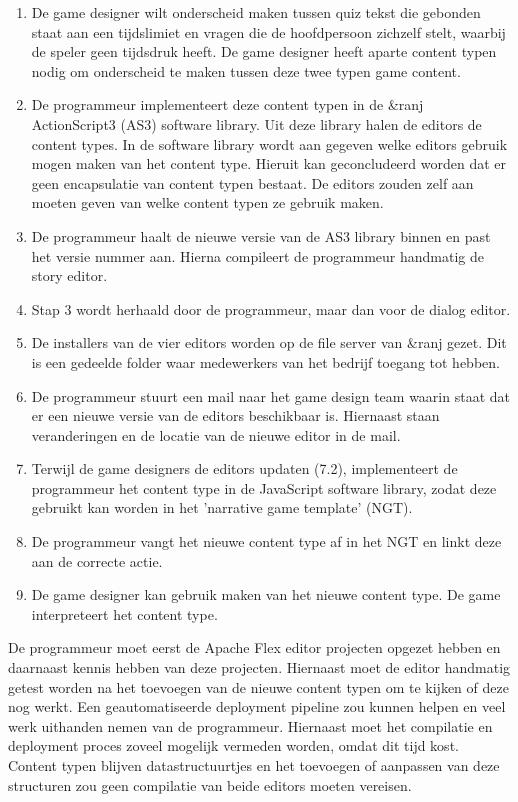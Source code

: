 \begin{enumerate}
    \item De game designer wilt onderscheid maken tussen quiz tekst die gebonden staat aan een tijdslimiet en vragen die de hoofdpersoon zichzelf stelt, waarbij de speler geen tijdsdruk heeft. De game designer heeft aparte content typen nodig om onderscheid te maken tussen deze twee typen game content.
    \item De programmeur implementeert deze content typen in de \&ranj ActionScript3 (AS3) software library. Uit deze library halen de editors de content types. In de software library wordt aan gegeven welke editors gebruik mogen maken van het content type. Hieruit kan geconcludeerd worden dat er geen encapsulatie van content typen bestaat. De editors zouden zelf aan moeten geven van welke content typen ze gebruik maken.
    \item De programmeur haalt de nieuwe versie van de AS3 library binnen en past het versie nummer aan. Hierna compileert de programmeur handmatig de story editor.    \item Stap 3 wordt herhaald door de programmeur, maar dan voor de dialog editor.
    \item De installers van de vier editors worden op de file server van \&ranj gezet. Dit is een gedeelde folder waar medewerkers van het bedrijf toegang tot hebben.
    \item De programmeur stuurt een mail naar het game design team waarin staat dat er een nieuwe versie van de editors beschikbaar is. Hiernaast staan veranderingen en de locatie van de nieuwe editor in de mail.
    \item Terwijl de game designers de editors updaten (7.2), implementeert de programmeur het content type in de JavaScript software library, zodat deze gebruikt kan worden in het 'narrative game template' (NGT).
    \item De programmeur vangt het nieuwe content type af in het NGT en linkt deze aan de correcte actie.
    \item De game designer kan gebruik maken van het nieuwe content type. De game interpreteert het content type.
\end{enumerate}

\noindent De programmeur moet eerst de Apache Flex editor projecten opgezet hebben en daarnaast kennis hebben van deze projecten. Hiernaast moet de editor handmatig getest worden na het toevoegen van de nieuwe content typen om te kijken of deze nog werkt.
Een geautomatiseerde deployment pipeline zou kunnen helpen en veel werk uithanden nemen van de programmeur. Hiernaast moet het compilatie en deployment proces zoveel mogelijk vermeden worden, omdat dit tijd kost. Content typen blijven datastructuurtjes en het toevoegen of aanpassen van deze structuren zou geen compilatie van beide editors moeten vereisen.

